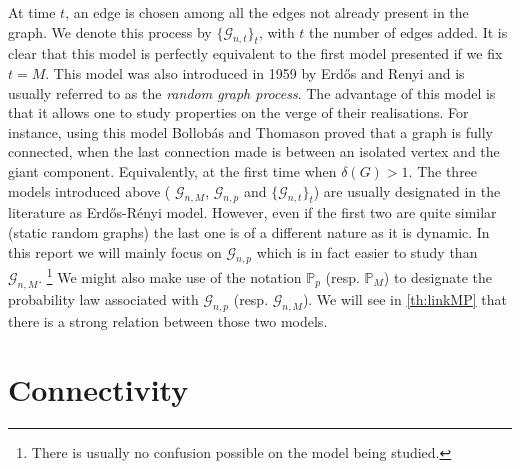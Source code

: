 At time $t$, an edge is chosen among all the edges not already present in the graph. We denote this process by $\{\mathcal{G}_{n, t}\}_t$, with $t$ the number of edges added. 
It is clear that this model is perfectly equivalent to the first model presented if we fix $t = M$. 
This model was also introduced in 1959 by Erd\H{o}s and Renyi and is usually referred to as the \emph{random graph process}.
The advantage of this model is that it allows one to study properties on the verge of their realisations.
For instance, using this model Bollob\'as and Thomason \cite{Bollob85} proved that a graph is fully connected, when the last connection made is between an isolated vertex and the giant component. Equivalently, at the first time when $\delta(G) > 1$.
\newline
The three models introduced above ( $\mathcal{G}_{n, M}$, $\mathcal{G}_{n, p}$ and $\{\mathcal{G}_{n, t}\}_t $) are usually designated in the literature as Erd\H{o}s-R\'enyi model.
However, even if the first two are quite similar (static random graphs) the last one is of a different nature as it is dynamic.
\newline
In this report we will mainly focus on $\mathcal{G}_{n, p}$ which is in fact easier to study than $\mathcal{G}_{n,M}$.
\footnote{There is usually no confusion possible on the model being studied.}
We might also make use of the notation $\mathbb{P}_{p}$ (resp. $\mathbb{P}_{M}$) to designate the probability law associated with $\mathcal{G}_{n, p}$ (resp. $\mathcal{G}_{n,M}$).
We will see in \eqref{th:linkMP} that there is a strong relation between those two models.

\section{Connectivity}

